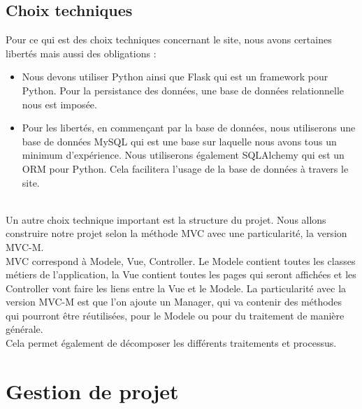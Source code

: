 \documentclass{tnreport}
\begin{document}
\subsection*{Choix techniques}
\begin{sloppypar}
    Pour ce qui est des choix techniques concernant le site, nous avons certaines libertés mais aussi des obligations : \\
    \begin{itemize}
        \item[\textbullet] Nous devons utiliser Python ainsi que Flask qui est un framework pour Python. Pour la persistance des données, une base de données relationnelle nous est imposée.\\
        \item[\textbullet] Pour les libertés, en commençant par la base de données, nous utiliserons une base de données MySQL qui est une base sur laquelle nous avons tous un minimum d'expérience. Nous utiliserons également SQLAlchemy qui est un ORM pour Python. Cela facilitera l'usage de la base de données à travers le site.\\
    \end{itemize}
    \\
    Un autre choix technique important est la structure du projet. Nous allons construire notre projet selon la méthode MVC avec une particularité, la version MVC-M.\\
    MVC correspond à Modele, Vue, Controller. Le Modele contient toutes les classes métiers de l'application, la Vue contient toutes les pages qui seront affichées et les Controller vont faire les liens entre la Vue et le Modele. La particularité avec la version MVC-M est que l'on ajoute un Manager, qui va contenir des méthodes qui pourront être réutilisées, pour le Modele ou pour du traitement de manière générale.\\
    Cela permet également de décomposer les différents traitements et processus. 
\end{sloppypar}

\clearpage
\section*{Gestion de projet}
\end{document}
